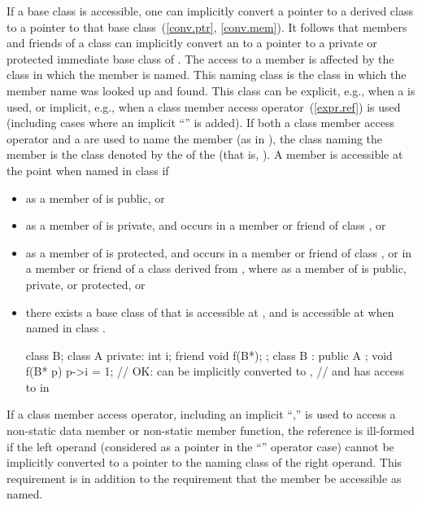 \pnum
If a base class is accessible, one can implicitly convert a pointer to
a derived class to a pointer to that base class~(\ref{conv.ptr}, \ref{conv.mem}).
\enternote
It follows that
members and friends of a class
can implicitly convert an
to a pointer to a private or protected immediate base class of
.
\exitnote
The access to a member is affected by the class in which the member is
named.
This naming class is the class in which the member name was looked
up and found.
\enternote
This class can be explicit, e.g., when a
is used, or implicit, e.g., when a class member access operator~(\ref{expr.ref}) is used (including cases where an implicit
``''
is
added).
If both a class member access operator and a
are used to name the member (as in
),
the class naming the member is the class denoted by the
of the
(that is,
).
\exitnote
A member
is accessible at the point
when named in class
if
\begin{itemize}
\item
{}
as a member of
is public, or
\item
{}
as a member of
is private, and
occurs in a member or friend of class
,
or
\item
{}
as a member of
is protected, and
occurs in a member or friend of class
,
or in a member or friend of a class
derived from
,
where
as a member of
is public, private, or protected, or
\item
there exists a base class
of
that is accessible at
,
and
is accessible at
when named in class
.
\enterexample

\begin{codeblock}
class B;
class A {
private:
  int i;
  friend void f(B*);
};
class B : public A { };
void f(B* p) {
  p->i = 1;         // OK:  can be implicitly converted to ,
                    // and  has access to  in 
}
\end{codeblock}
\exitexample
\end{itemize}

\pnum
If a class member access operator, including an implicit
``,''
is used to access a non-static data member or non-static
member function, the reference is ill-formed if the
left operand (considered as a pointer in the
``''
operator case) cannot be implicitly converted to a
pointer to the naming class of the right operand.
\enternote
This requirement is in addition to the requirement that
the member be accessible as named.
\exitnote

